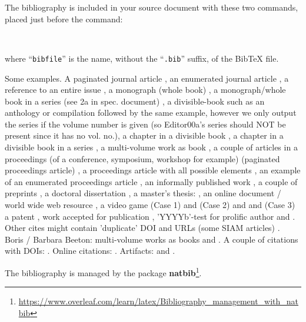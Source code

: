 The bibliography is included in your source document with these two commands, placed just before the \verb|| command:
\begin{verbatim}


\end{verbatim}
where ``\verb|bibfile|'' is the name, without the ``\verb|.bib|'' suffix, of the BibTeX file.

Some examples.  A paginated journal article \cite{Abril07}, an enumerated journal article \cite{Cohen07}, a reference to an entire issue \cite{JCohen96}, a monograph (whole book) \cite{Kosiur01}, a monograph/whole book in a series (see 2a in spec. document) \cite{Harel79}, a divisible-book such as an anthology or compilation \cite{Editor00} followed by the same example, however we only output the series if the volume number is given \cite{Editor00a} (so Editor00a's series should NOT be present since it has no vol. no.), a chapter in a divisible book \cite{Spector90}, a chapter in a divisible book in a series \cite{Douglass98}, a multi-volume work as book \cite{Knuth97}, a couple of articles in a proceedings (of a conference, symposium, workshop for example) (paginated proceedings article) \cite{Andler79, Hagerup1993}, a proceedings article with all possible elements \cite{Smith10}, an example of an enumerated proceedings article \cite{VanGundy07}, an informally published work \cite{Harel78}, a couple of preprints \cite{Bornmann2019, AnzarootPBM14}, a doctoral dissertation \cite{Clarkson85}, a master's thesis: \cite{anisi03}, an online document / world wide web resource \cite{Thornburg01, Ablamowicz07, Poker06}, a video game (Case 1) \cite{Obama08} and (Case 2) \cite{Novak03} and \cite{Lee05} and (Case 3) a patent \cite{JoeScientist001}, work accepted for publication \cite{rous08}, 'YYYYb'-test for prolific author \cite{SaeediMEJ10} and \cite{SaeediJETC10}. Other cites might contain 'duplicate' DOI and URLs (some SIAM articles) \cite{Kirschmer:2010:AEI:1958016.1958018}. Boris / Barbara Beeton: multi-volume works as books \cite{MR781536} and \cite{MR781537}. A couple of citations with DOIs: \cite{2004:ITE:1009386.1010128,Kirschmer:2010:AEI:1958016.1958018}. Online citations: \cite{TUGInstmem, Thornburg01, CTANacmart}. Artifacts: \cite{R} and \cite{UMassCitations}.

The bibliography is managed by the package \textbf{natbib}\footnote{\url{https://www.overleaf.com/learn/latex/Bibliography_management_with_natbib}}.

